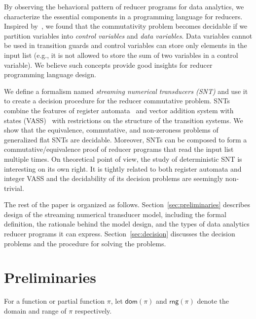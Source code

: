 \documentclass[runningheads,a4paper]{llncs}
\newcommand\dom{\mathsf{dom}}
\newcommand\rng{\mathsf{rng}}
\begin{document}
By observing the behavioral pattern of reducer programs for data analytics, we characterize the essential components in a programming language for reducers. %
Inspired by~\cite{RP11}, we found that the commutativity problem becomes decidable if we partition variables into \emph{control variables} and \emph{data variables}. Data variables cannot be used in transition guards and control variables can store only elements in the input list (e.g., it is not allowed to store the sum of two variables in a control variable). 
We believe such concepts provide good insights for reducer programming language design.

We define a formalism named \emph{streaming numerical transducers (SNT)} and use it to create a decision procedure for the reducer commutative problem.
SNTs combine the features of register automata~\cite{XX} and vector addition system with states (VASS)~\cite{YY} with restrictions on the structure of the transition systems.
We show that the equivalence, commutative, and non-zeroness problems of generalized flat SNTs are decidable.
Moreover, SNTs can be composed to form a commutative/equivalence proof of reducer programs that read the input list multiple times.
On theoretical point of view, the study of deterministic SNT is
interesting on its own right. It is tightly related to both register automata and integer VASS and the decidability of its decision problems are seemingly non-trivial. 

The rest of the paper is organized as follows. Section~\ref{sec:preliminaries} describes design of the streaming numerical transducer model, including the formal definition, the rationale behind the model design, and the types of data analytics reducer programs it can express. Section~\ref{sec:decision} discusses the decision problems and the procedure for solving the problems.

\section{Preliminaries}
%
For a function or partial function $\pi$, let $\dom(\pi)$ and $\rng(\pi)$ denote the domain and range of $\pi$ respectively.
\end{document}
